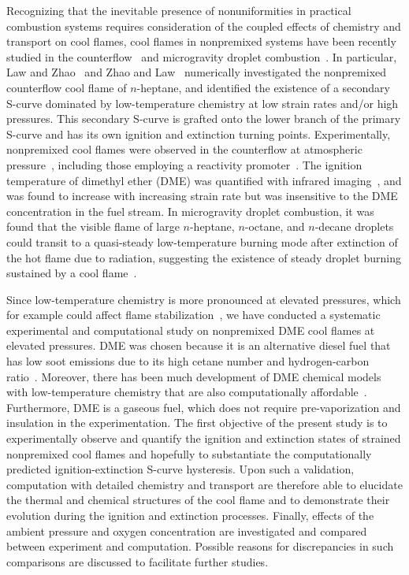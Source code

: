 \documentclass[review,3p,times]{elsarticle}
\begin{document}
Recognizing that the inevitable presence of nonuniformities in practical combustion systems requires consideration of the coupled effects of chemistry and transport on cool flames, cool flames in nonpremixed systems have been recently studied in the counterflow~\cite{law12,zhao13,deng14,won15} and microgravity droplet combustion~\cite{nayagam12,farouk15,nayagam15}.  In particular, Law and Zhao~\cite{law12} and Zhao and Law~\cite{zhao13} numerically investigated the nonpremixed counterflow cool flame of $n$-heptane, and identified the existence of a secondary S-curve dominated by low-temperature chemistry at low strain rates and/or high pressures.  This secondary S-curve is grafted onto the lower branch of the primary S-curve and has its own ignition and extinction turning points.  Experimentally, nonpremixed cool flames were observed in the counterflow at atmospheric pressure~\cite{deng14}, including those employing a reactivity promoter~\cite{won15,ju16}.  The ignition temperature of dimethyl ether (DME) was quantified with infrared imaging~\cite{deng14}, and was found to increase with increasing strain rate but was insensitive to the DME concentration in the fuel stream.  In microgravity droplet combustion, it was found that the visible flame of large $n$-heptane, $n$-octane, and $n$-decane droplets could transit to a quasi-steady low-temperature burning mode after extinction of the hot flame due to radiation, suggesting the existence of steady droplet burning sustained by a cool flame~\cite{nayagam15}.  

Since low-temperature chemistry is more pronounced at elevated pressures, which for example could affect flame stabilization~\cite{deng16}, we have conducted a systematic experimental and computational study on nonpremixed DME cool flames at elevated pressures. \textcolor{Rev1}{DME was chosen because it is an alternative diesel fuel that has low soot emissions due to its high cetane number and hydrogen-carbon ratio~\cite{mcilroy00}.  Moreover, there has been much development of DME chemical models with low-temperature chemistry that are also computationally affordable~\cite{zhao08,bhagatwala15}.  Furthermore, DME is a gaseous fuel, which does not require pre-vaporization and insulation in the experimentation.}  The first objective of the present study is to experimentally observe and quantify the ignition and extinction states of strained nonpremixed cool flames and hopefully to substantiate the computationally predicted ignition-extinction S-curve hysteresis.  Upon such a validation, computation with detailed chemistry and transport are therefore able to elucidate the thermal and chemical structures of the cool flame and to demonstrate their evolution during the ignition and extinction processes.  Finally, effects of the ambient pressure and oxygen concentration are investigated and compared between experiment and computation.  Possible reasons for discrepancies in such comparisons are discussed to facilitate further studies.
 
\end{document}
